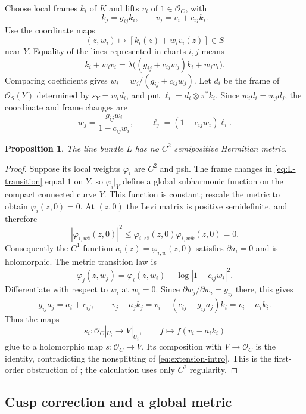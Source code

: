 \documentclass[11pt]{amsart}
\newtheorem{proposition}[theorem]{Proposition}
\theoremstyle{definition}
\theoremstyle{remark}
\numberwithin{equation}{section}
\newcommand{\OO}{\mathcal O}
\begin{document}
Choose local frames $k_i$ of $K$ and lifts $v_i$ of $1\in\OO_C$,
with
\[
 k_j=g_{ij}k_i,\qquad v_j=v_i+c_{ij}k_i.
\]
Use the coordinate maps
\[
 (z,w_i)\longmapsto [k_i(z)+w_iv_i(z)]\in S
\]
near $Y$. Equality of the lines represented in charts $i,j$ means
\[
 k_i+w_iv_i=\lambda\bigl((g_{ij}+c_{ij}w_j)k_i+w_jv_i\bigr).
\]
Comparing coefficients gives
$w_i=w_j/(g_{ij}+c_{ij}w_j)$. Let $d_i$ be the frame of
$\OO_S(Y)$ determined by $s_Y=w_id_i$, and put
$\ell_i=d_i\otimes\pi^*k_i$. Since $w_id_i=w_jd_j$,
the coordinate and frame changes are
\begin{equation}\label{eq:L-transition}
 w_j=\frac{g_{ij}w_i}{1-c_{ij}w_i},\qquad
 \ell_j=(1-c_{ij}w_i)\ell_i.
\end{equation}

\begin{proposition}\label{prop:no-metric}
The line bundle $L$ has no $C^2$ semipositive Hermitian metric.
\end{proposition}
\begin{proof}
Suppose its local weights $\varphi_i$ are $C^2$ and psh.
The frame changes in \eqref{eq:L-transition} equal $1$ on $Y$,
so $\varphi_i|_Y$ define a global subharmonic function on the
compact connected curve $Y$. This function is constant; rescale the
metric to obtain $\varphi_i(z,0)=0$. At $(z,0)$ the Levi matrix is
positive semidefinite, and therefore
\[
 |\varphi_{i,w\bar z}(z,0)|^2
 \le \varphi_{i,z\bar z}(z,0)\varphi_{i,w\bar w}(z,0)=0.
\]
Consequently the $C^1$ function $a_i(z)=\varphi_{i,w}(z,0)$
satisfies $\bar\partial a_i=0$ and is holomorphic. The metric
transition law is
\[
 \varphi_j(z,w_j)=\varphi_i(z,w_i)-\log|1-c_{ij}w_i|^2.
\]
Differentiate with respect to $w_i$ at $w_i=0$. Since
$\partial w_j/\partial w_i=g_{ij}$ there, this gives
\[
 g_{ij}a_j=a_i+c_{ij},\qquad
 v_j-a_jk_j=v_i+(c_{ij}-g_{ij}a_j)k_i=v_i-a_ik_i.
\]
Thus the maps
\[
 s_i:\OO_C|_{U_i}\longrightarrow V|_{U_i},\qquad
 f\longmapsto f(v_i-a_ik_i)
\]
glue to a holomorphic map $s:\OO_C\to V$. Its composition with
$V\to\OO_C$ is the identity, contradicting the nonsplitting of
\eqref{eq:extension-intro}. This is the first-order obstruction of
\cite[Theorem~1.4]{Koike2021}; the calculation uses only $C^2$
regularity.
\end{proof}

\subsection{Cusp correction and a global metric}\label{sec:cusp}
\end{document}
